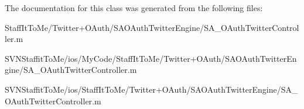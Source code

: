 \-The documentation for this class was generated from the following files\-:\begin{DoxyCompactItemize}
\item 
\-Staff\-It\-To\-Me/\-Twitter+\-O\-Auth/\-S\-A\-O\-Auth\-Twitter\-Engine/\-S\-A\-\_\-\-O\-Auth\-Twitter\-Controller.\-m\item 
\-S\-V\-N\-Staffit\-To\-Me/ios/\-My\-Code/\-Staff\-It\-To\-Me/\-Twitter+\-O\-Auth/\-S\-A\-O\-Auth\-Twitter\-Engine/\-S\-A\-\_\-\-O\-Auth\-Twitter\-Controller.\-m\item 
\-S\-V\-N\-Staffit\-To\-Me/ios/\-Staff\-It\-To\-Me/\-Twitter+\-O\-Auth/\-S\-A\-O\-Auth\-Twitter\-Engine/\-S\-A\-\_\-\-O\-Auth\-Twitter\-Controller.\-m\end{DoxyCompactItemize}
